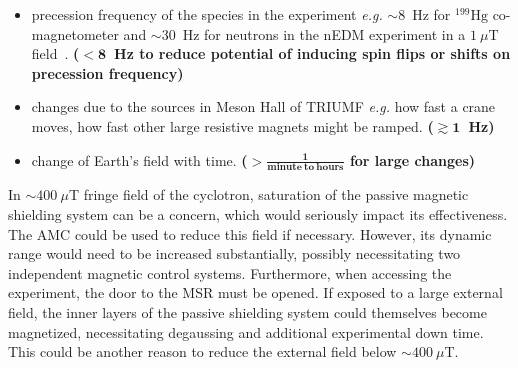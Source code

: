 \begin{itemize}
    \item  precession frequency of the species in the experiment {\it e.g.} $\sim8$~Hz for $\mathrm{^{199}Hg}$ co-magnetometer and $\sim30$~Hz for neutrons in the nEDM experiment in a $1~\mu$T field~\cite{bea_paper}. {\bf ($\mathbf{<8}$~Hz to reduce potential of inducing spin flips or shifts on precession frequency)}
    \item  changes due to the sources in Meson Hall of TRIUMF {\it e.g.} how fast a crane moves, how fast other large resistive magnets might be ramped. {\bf ($\mathbf{\gtrsim1}$~Hz)}
    \item  change of Earth's field with time. {\bf ($\mathbf{>\frac{1}{\mathrm{\mathbf{minute~to~hours}}}}$ for large changes)}
\end{itemize}






In $\sim400~\mu$T fringe field of the cyclotron, saturation of the passive magnetic shielding system can be a concern, which would seriously impact its effectiveness. The AMC could be used to reduce this field if necessary. However, its dynamic range would need to be increased substantially, possibly necessitating two independent magnetic control systems. Furthermore, when accessing the experiment, the door to the MSR must be opened. If exposed to a large external field, the inner layers of the passive shielding system could themselves become magnetized, necessitating degaussing and additional experimental down time. This could be another reason to reduce the external field below $\sim400~\mu$T.




